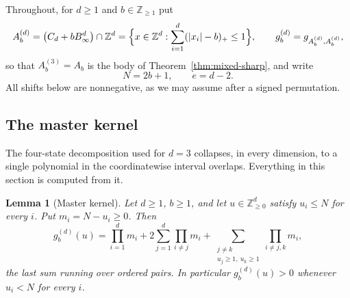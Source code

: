 \documentclass[pdflatex,sn-mathphys-num]{sn-jnl}
\theoremstyle{thmstyleone}
\newtheorem{lemma}[theorem]{Lemma}
\theoremstyle{thmstylethree}
\theoremstyle{thmstyletwo}
\newcommand{\Z}{\mathbb Z}
\begin{document}
Throughout, for $d\ge1$ and $b\in\Z_{\ge1}$ put
\[
 A_b^{(d)}=\bigl(C_d+bB_\infty^d\bigr)\cap\Z^d
 =\Bigl\{x\in\Z^d:\sum_{i=1}^d(|x_i|-b)_+\le1\Bigr\},
 \qquad
 g_b^{(d)}=g_{A_b^{(d)},A_b^{(d)}},
\]
so that $A_b^{(3)}=A_b$ is the body of Theorem~\ref{thm:mixed-sharp}, and
write
\[
 N=2b+1,\qquad e=d-2.
\]
All shifts below are nonnegative, as we may assume after a signed
permutation.

\subsection{The master kernel}

The four-state decomposition used for $d=3$ collapses, in every dimension, to
a single polynomial in the coordinatewise interval overlaps.  Everything in
this section is computed from it.

\begin{lemma}[Master kernel]
\label{lem:master-kernel}
Let $d\ge1$, $b\ge1$, and let $u\in\Z_{\ge0}^d$ satisfy $u_i\le N$ for every
$i$.  Put $m_i=N-u_i\ge0$.  Then
\begin{equation}
 g_b^{(d)}(u)
 =\prod_{i=1}^dm_i
 +2\sum_{j=1}^d\prod_{i\ne j}m_i
 +\sum_{\substack{j\ne k\\u_j\ge1,\ u_k\ge1}}\prod_{i\ne j,k}m_i,
 \label{eq:master-kernel}
\end{equation}
the last sum running over ordered pairs.  In particular $g_b^{(d)}(u)>0$
whenever $u_i<N$ for every $i$.
\end{lemma}
\end{document}
